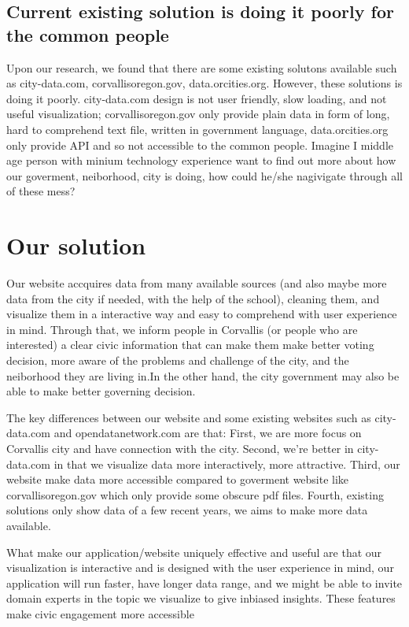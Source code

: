 \documentclass[12pt]{article}
\begin{document}
\subsection{Current existing solution is doing it poorly for the common people}

Upon our research, we found that there are some existing solutons available such as city-data.com, corvallisoregon.gov, data.orcities.org. However, these solutions is doing it poorly. city-data.com design is not user friendly, slow loading, and not useful visualization; corvallisoregon.gov only provide plain data in form of long, hard to comprehend text file, written in government language, data.orcities.org only provide API and so not accessible to the common people. Imagine I middle age person with minium technology experience want to find out more about how our goverment, neiborhood, city is doing, how could he/she nagivigate through all of these mess?


\section{Our solution}

Our website accquires data from many available sources (and also maybe more data from the city if needed, with the help of the school), cleaning them, and visualize them in a interactive way and easy to comprehend with user experience in mind. Through that, we inform people in Corvallis (or people who are interested) a clear civic information that can make them make better voting decision, more aware of the problems and challenge of the city, and the neiborhood they are living in.In the other hand, the city government may also be able to make better governing decision.

The key differences between our website and some existing websites such as city-data.com and opendatanetwork.com are that: First, we are more focus on Corvallis city and have connection with the city. Second, we're better in city-data.com in that we visualize data more interactively, more attractive. Third, our website make data more accessible compared to goverment website like corvallisoregon.gov which only provide some obscure pdf files. Fourth, existing solutions only show data of a few recent years, we aims to make more data available. 

What make our application/website uniquely effective and useful are that our visualization is interactive and is designed with the user experience in mind, our application will run faster, have longer data range, and we might be able to invite domain experts in the topic we visualize to give inbiased insights. These features make civic engagement more accessible 
\end{document}
